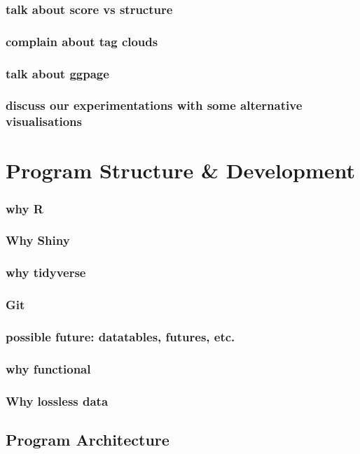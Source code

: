 \documentclass[11pt, a4paper, oneside]{report}
\begin{document}
\subsection{talk about score vs structure}
\subsection{complain about tag clouds}
\subsection{talk about ggpage}
\subsection{discuss our experimentations with some alternative visualisations}
\chapter{Program Structure \& Development}
\label{cha:program-structure}

\subsection{why R}
\subsection{Why Shiny}
\subsection{why tidyverse}
\subsection{Git}
\subsection{possible future: datatables, futures, etc.}
\subsection{why functional}
\subsection{Why lossless data}

\section{Program Architecture}
\label{sec:program-architecture-1}
\end{document}

